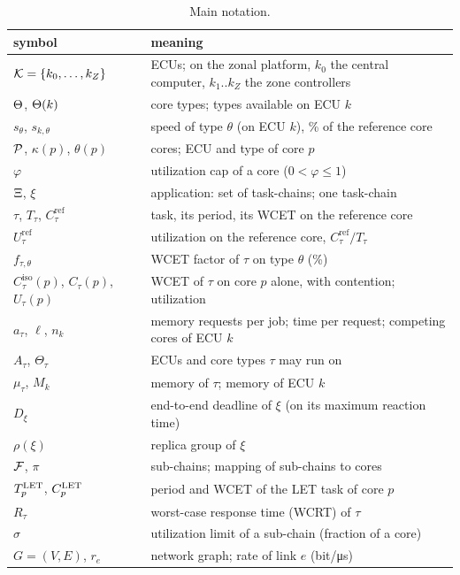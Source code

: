 \begin{table}[t]
\centering\footnotesize
\caption{Main notation.}
\label{tab:notation}
\setlength{\tabcolsep}{3pt}
\begin{tabularx}{\columnwidth}{@{}lX@{}}
\toprule
\rowcolor{white}
symbol & meaning \\
\midrule
$\mathcal{K}=\{k_0,\dots,k_Z\}$ & ECUs; on the zonal platform, $k_0$ the central computer, $k_1..k_Z$ the zone controllers \\
$\Theta$, $\Theta(k)$ & core types; types available on ECU $k$ \\
$s_\theta$, $s_{k,\theta}$ & speed of type $\theta$ (on ECU $k$), \% of the reference core \\
$\mathcal{P}$, $\kappa(p)$, $\theta(p)$ & cores; ECU and type of core $p$ \\
$\varphi$ & utilization cap of a core ($0<\varphi\le1$) \\
$\Xi$, $\xi$ & application: set of task-chains; one task-chain \\
$\tau$, $T_\tau$, $C^{\mathrm{ref}}_\tau$ & task, its period, its WCET on the reference core \\
$U^{\mathrm{ref}}_\tau$ & utilization on the reference core, $C^{\mathrm{ref}}_\tau/T_\tau$ \\
$f_{\tau,\theta}$ & WCET factor of $\tau$ on type $\theta$ (\%) \\
$C^{\mathrm{iso}}_\tau(p)$, $C_\tau(p)$, $U_\tau(p)$ & WCET of $\tau$ on core $p$ alone, with contention; utilization \\
$a_\tau$, $\ell$, $n_k$ & memory requests per job; time per request; competing cores of ECU $k$ \\
$A_\tau$, $\Theta_\tau$ & ECUs and core types $\tau$ may run on \\
$\mu_\tau$, $M_k$ & memory of $\tau$; memory of ECU $k$ \\
$D_\xi$ & end-to-end deadline of $\xi$ (on its maximum reaction time) \\
$\rho(\xi)$ & replica group of $\xi$ \\
$\mathcal{F}$, $\pi$ & sub-chains; mapping of sub-chains to cores \\
$T^{\mathrm{LET}}_p$, $C^{\mathrm{LET}}_p$ & period and WCET of the LET task of core $p$ \\
$R_\tau$ & worst-case response time (WCRT) of $\tau$ \\
$\sigma$ & utilization limit of a sub-chain (fraction of a core) \\
$G=(V,E)$, $r_e$ & network graph; rate of link $e$ (bit/\si{\micro s}) \\

\end{tabularx}
\end{table}
